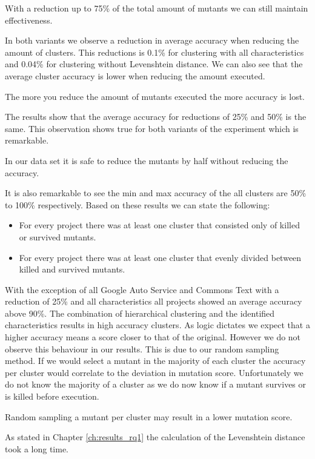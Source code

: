 \documentclass[../main]{subfiles}
\begin{document}
\begin{finding}
    With a reduction up to 75\% of the total amount of mutants we can still maintain effectiveness.
\end{finding}
In both variants we observe a reduction in average accuracy when reducing the amount of clusters.
This reductions is 0.1\% for clustering with all characteristics and 0.04\% for clustering without Levenshtein distance.
We can also see that the average cluster accuracy is lower when reducing the amount executed.
\begin{finding}
    The more you reduce the amount of mutants executed the more accuracy is lost.
\end{finding}
The results show that the average accuracy for reductions of 25\% and 50\% is the same.
This observation shows true for both variants of the experiment which is remarkable.
\begin{finding}
    In our data set it is safe to reduce the mutants by half without reducing the accuracy.
\end{finding}
It is also remarkable to see the min and max accuracy of the all clusters are 50\% to 100\% respectively.
Based on these results we can state the following:
\begin{itemize}
    \item For every project there was at least one cluster that consisted only of killed or survived mutants.
    \item For every project there was at least one cluster that evenly divided between killed and survived mutants.
\end{itemize}
With the exception of all Google Auto Service and Commons Text with a reduction of 25\% and all characteristics all projects showed an average accuracy above 90\%.
The combination of hierarchical clustering and the identified characteristics results in high accuracy clusters.
As logic dictates we expect that a higher accuracy means a score closer to that of the original.
However we do not observe this behaviour in our results.
This is due to our random sampling method.
If we would select a mutant in the majority of each cluster the accuracy per cluster would correlate to the deviation in mutation score.
Unfortunately we do not know the majority of a cluster as we do now know if a mutant survives or is killed before execution.
\begin{finding}
    Random sampling a mutant per cluster may result in a lower mutation score.
\end{finding}
As stated in Chapter \ref{ch:results_rq1} the calculation of the Levenshtein distance took a long time.
\end{document}
